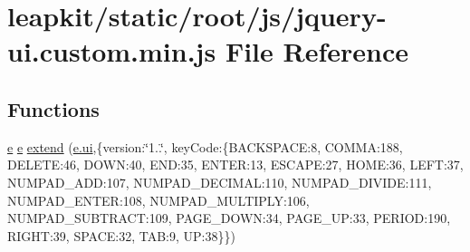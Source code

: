 \hypertarget{static_2root_2js_2jquery-ui_8custom_8min_8js}{\section{leapkit/static/root/js/jquery-\/ui.custom.\-min.\-js File Reference}
\label{static_2root_2js_2jquery-ui_8custom_8min_8js}
}
\subsection*{Functions}
\begin{DoxyCompactItemize}
\item 
\hyperlink{static_2root_2js_2jquery-ui_8custom_8min_8js_abea95a4e94bc6f4151d5683d4c12c3f4}{e} \hyperlink{static_2root_2js_2jquery-ui_8custom_8min_8js_abea95a4e94bc6f4151d5683d4c12c3f4}{e} \hyperlink{static_2root_2js_2jquery-ui_8custom_8min_8js_acc7e6cb2b5394dabfe11ba6b8cdf9a30}{extend} (\hyperlink{static_2root_2js_2jquery-ui_8custom_8min_8js_a8ebc3a47bff7b1c2623695f3db4c0761}{e.\-ui},\{version\-:\char`\"{}1..\char`\"{}, key\-Code\-:\{B\-A\-C\-K\-S\-P\-A\-C\-E\-:8, C\-O\-M\-M\-A\-:188, D\-E\-L\-E\-T\-E\-:46, D\-O\-W\-N\-:40, E\-N\-D\-:35, E\-N\-T\-E\-R\-:13, E\-S\-C\-A\-P\-E\-:27, H\-O\-M\-E\-:36, L\-E\-F\-T\-:37, N\-U\-M\-P\-A\-D\-\_\-\-A\-D\-D\-:107, N\-U\-M\-P\-A\-D\-\_\-\-D\-E\-C\-I\-M\-A\-L\-:110, N\-U\-M\-P\-A\-D\-\_\-\-D\-I\-V\-I\-D\-E\-:111, N\-U\-M\-P\-A\-D\-\_\-\-E\-N\-T\-E\-R\-:108, N\-U\-M\-P\-A\-D\-\_\-\-M\-U\-L\-T\-I\-P\-L\-Y\-:106, N\-U\-M\-P\-A\-D\-\_\-\-S\-U\-B\-T\-R\-A\-C\-T\-:109, P\-A\-G\-E\-\_\-\-D\-O\-W\-N\-:34, P\-A\-G\-E\-\_\-\-U\-P\-:33, P\-E\-R\-I\-O\-D\-:190, R\-I\-G\-H\-T\-:39, S\-P\-A\-C\-E\-:32, T\-A\-B\-:9, U\-P\-:38\}\})
\item 

\end{DoxyCompactItemize}
